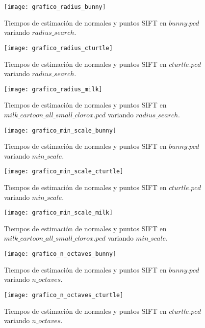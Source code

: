 \begin{figure}[h!]
\centering
\texttt{[image: grafico\_radius\_bunny]}
\caption{Tiempos de estimación de normales y puntos SIFT en $bunny.pcd$ variando $radius\_search$.}\label{fig:grafico_radius_bunny}
\end{figure}

\begin{figure}[h!]
\centering
\texttt{[image: grafico\_radius\_cturtle]}
\caption{Tiempos de estimación de normales y puntos SIFT en $cturtle.pcd$ variando $radius\_search$.}\label{fig:grafico_radius_cturtle}
\end{figure}


\begin{figure}[h!]
\centering
\texttt{[image: grafico\_radius\_milk]}
\caption{Tiempos de estimación de normales y puntos SIFT en $milk\_cartoon\_all\_small\_clorox.pcd$ variando $radius\_search$.}\label{fig:grafico_radius_milk}
\end{figure}


\begin{figure}[h!]
\centering
\texttt{[image: grafico\_min\_scale\_bunny]}
\caption{Tiempos de estimación de normales y puntos SIFT en $bunny.pcd$ variando $min\_scale$.}\label{fig:grafico_min_scale_bunny}
\end{figure}

\begin{figure}[h!]
\centering
\texttt{[image: grafico\_min\_scale\_cturtle]}
\caption{Tiempos de estimación de normales y puntos SIFT en $cturtle.pcd$ variando $min\_scale$.}\label{fig:grafico_min_scale_cturtle}
\end{figure}


\begin{figure}[h!]
\centering
\texttt{[image: grafico\_min\_scale\_milk]}
\caption{Tiempos de estimación de normales y puntos SIFT en $milk\_cartoon\_all\_small\_clorox.pcd$ variando $min\_scale$.}\label{fig:grafico_min_scale_milk}
\end{figure}


\begin{figure}[h!]
\centering
\texttt{[image: grafico\_n\_octaves\_bunny]}
\caption{Tiempos de estimación de normales y puntos SIFT en $bunny.pcd$ variando $n\_octaves$.}\label{fig:grafico_n_octaves_bunny}
\end{figure}

\begin{figure}[h!]
\centering
\texttt{[image: grafico\_n\_octaves\_cturtle]}
\caption{Tiempos de estimación de normales y puntos SIFT en $cturtle.pcd$ variando $n\_octaves$.}\label{fig:grafico_n_octaves_cturtle}
\end{figure}

